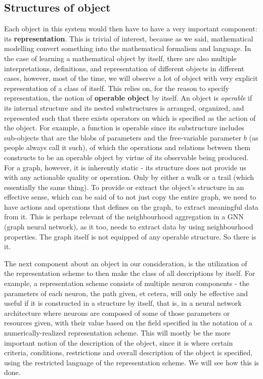 \documentclass[twoside,10pt]{article}
\begin{document}
\subsection{Structures of object}


Each object in this system would then have to have a very important component: its \textbf{representation}. This is trivial of interest, because as we said, mathematical modelling convert something into the mathematical formalism and language. In the case of learning a mathematical object by itself, there are also multiple interpretations, definitions, and representation of different objects in different cases, however, most of the time, we will observe a lot of object with very explicit representation of a class of itself. This relies on, for the reason to specify representation, the notion of \textbf{operable object} by itself. An object is \textit{operable} if its internal structure and its nested substructures is arranged, organized, and represented such that there exists operators on which is specified as the action of the object. For example, a function is operable since its substructure includes sub-objects that are the blobs of parameters and the free-variable parameter $b$ (as people always call it such), of which the operations and relations between them constructs to be an operable object by virtue of its observable being produced. For a graph, however, it is inherently static - its structure does not provide us with any actionable quality or operation. Only by either a walk or a trail (which essentially the same thing). To provide or extract the object's structure in an effective sense, which can be said of to not just copy the entire graph, we need to have actions and operations that defines on the graph, to extract meaningful data from it. This is perhaps relevant of the neighbourhood aggregation in a GNN (graph neural network), as it too, needs to extract data by using neighbourhood properties. The graph itself is not equipped of any operable structure. So there is it. 

The next component about an object in our consideration, is the utilization of the representation scheme to then make the class of all descriptions by itself. For example, a representation scheme consists of multiple neuron components - the parameters of each neuron, the path given, et cetera, will only be effective and useful if it is constructed in a structure by itself, that is, in a neural network architecture where neurons are composed of some of those parameters or resources given, with their value based on the field specified in the notation of a numerically-realized representation scheme. This will mostly be the more important notion of the description of the object, since it is where certain criteria, conditions, restrictions and overall description of the object is specified, using the restricted language of the representation scheme. We will see how this is done. 
\end{document}
